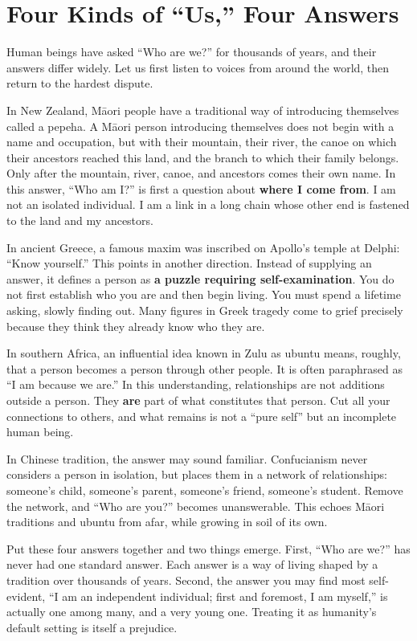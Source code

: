 \section{Four Kinds of ``Us,'' Four Answers}
Human beings have asked ``Who are we?'' for thousands of years, and their answers differ widely. Let us first listen to voices from around the world, then return to the hardest dispute.

In New Zealand, Māori people have a traditional way of introducing themselves called a pepeha. A Māori person introducing themselves does not begin with a name and occupation, but with their mountain, their river, the canoe on which their ancestors reached this land, and the branch to which their family belongs. Only after the mountain, river, canoe, and ancestors comes their own name. In this answer, ``Who am I?'' is first a question about \textbf{where I come from}. I am not an isolated individual. I am a link in a long chain whose other end is fastened to the land and my ancestors.

In ancient Greece, a famous maxim was inscribed on Apollo's temple at Delphi: ``Know yourself.'' This points in another direction. Instead of supplying an answer, it defines a person as \textbf{a puzzle requiring self-examination}. You do not first establish who you are and then begin living. You must spend a lifetime asking, slowly finding out. Many figures in Greek tragedy come to grief precisely because they think they already know who they are.

In southern Africa, an influential idea known in Zulu as ubuntu means, roughly, that a person becomes a person through other people. It is often paraphrased as ``I am because we are.'' In this understanding, relationships are not additions outside a person. They \textbf{are} part of what constitutes that person. Cut all your connections to others, and what remains is not a ``pure self'' but an incomplete human being.

In Chinese tradition, the answer may sound familiar. Confucianism never considers a person in isolation, but places them in a network of relationships: someone's child, someone's parent, someone's friend, someone's student. Remove the network, and ``Who are you?'' becomes unanswerable. This echoes Māori traditions and ubuntu from afar, while growing in soil of its own.

Put these four answers together and two things emerge. First, ``Who are we?'' has never had one standard answer. Each answer is a way of living shaped by a tradition over thousands of years. Second, the answer you may find most self-evident, ``I am an independent individual; first and foremost, I am myself,'' is actually one among many, and a very young one. Treating it as humanity's default setting is itself a prejudice.

